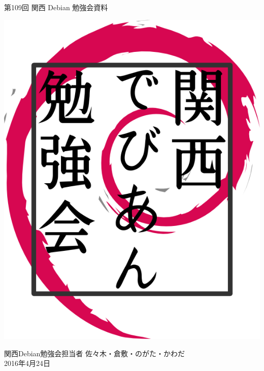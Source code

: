 \documentclass[mingoth,a4paper]{jsarticle}
\newcommand{\debmtgyear}{2016}
\newcommand{\debmtgdate}{24}
\newcommand{\debmtgmonth}{4}
\newcommand{\debmtgnumber}{109}
\begin{document}
\begin{titlepage}


  第\debmtgnumber{}回 関西 Debian 勉強会資料

  \vspace{2cm}

  \begin{center}
    \includegraphics{image200802/kansaidebianlogo.png}
  \end{center}

  \begin{flushright}
    \hfill{}関西Debian勉強会担当者 佐々木・倉敷・のがた・かわだ \\
    \hfill{}\debmtgyear{}年\debmtgmonth{}月\debmtgdate{}日
  \end{flushright}

  \thispagestyle{empty}
\end{titlepage}

\end{document}
